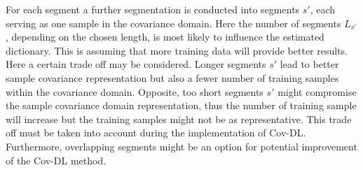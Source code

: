For each segment a further segmentation is conducted into segments $s'$, each serving as one sample in the covariance domain. Here the number of segments $L_{s'}$, depending on the chosen length, is most likely to influence the estimated dictionary. This is assuming that more training data will provide better results. Here a certain trade off    may be considered. Longer segments $s'$ lead to better sample covariance representation but also a fewer number of training samples within the covariance domain. Opposite, too short segments $s'$ might compromise the sample covariance domain representation, thus the number of training sample will increase but the training samples might not be as representative.                 
This trade off must be taken into account during the implementation of Cov-DL.  
Furthermore, overlapping segments might be an option for potential improvement of the Cov-DL method.